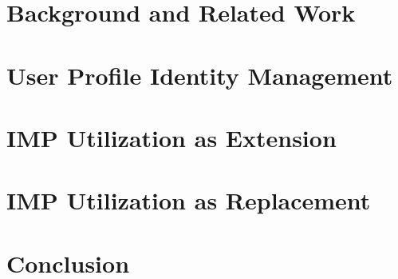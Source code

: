 \documentclass[
     12pt,         %
     a4paper,      %
     BCOR=10mm,version=first,     %
     DIV=14,version=first,        %
     ]{scrreprt}
\begin{document}
\chapter{Background and Related Work} \label{chapter:background}


\chapter{User Profile Identity Management} \label{chapter:user_profile_identity_management}


\chapter{IMP Utilization as Extension}


\chapter{IMP Utilization as Replacement}


\chapter{Conclusion}


\printbibliography
\end{document}
